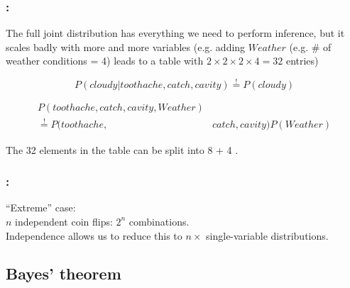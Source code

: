 \begin{frame}\frametitle{\secname:~\subsecname}

The full joint distribution has everything we need to perform inference,
but it scales badly with more and more variables (e.g. adding $\mathit{Weather}$ (e.g. \# of weather conditions = 4) leads to a table with $2\times2\times2\times4=32$ entries)

\pause


\pause

\slidesonly{\vspace{-5mm}}

\begin{equation}
P(\mathit{cloudy} | \mathit{toothache}, \mathit{catch}, \mathit{cavity}) \stackrel{!}{=} P(\mathit{cloudy})
\end{equation}

\pause


\pause


\slidesonly{\vspace{-5mm}}

\begin{align}
P(\mathit{toothache}, \mathit{catch}, \mathit{cavity}, \mathit{Weather}) &\\
\stackrel{!}{=} P(\mathit{toothache}, &\mathit{catch}, \mathit{cavity})P(\mathit{Weather})
\end{align}


The 32 elements in the table can be split into  8 + 4 .

\end{frame} 

\begin{frame}\frametitle{\secname:~\subsecname}

``Extreme'' case:\\
 $n$ independent coin flips: $2^n$ combinations.\\
 Independence allows us to reduce this to $n \times$ single-variable distributions.

\end{frame}

\subsection{Bayes' theorem}

